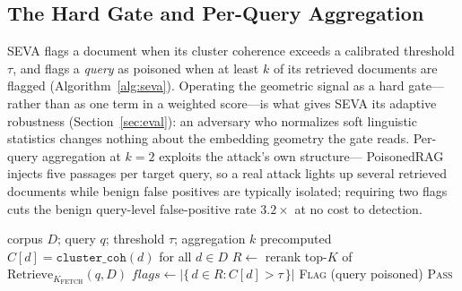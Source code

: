 \documentclass[10pt,journal,compsoc]{IEEEtran}
\begin{document}
\subsection{The Hard Gate and Per-Query Aggregation}
SEVA flags a document when its cluster coherence exceeds a calibrated threshold
$\tau$, and flags a \emph{query} as poisoned when at least $k$ of its retrieved
documents are flagged (Algorithm~\ref{alg:seva}). Operating the geometric signal
as a hard gate---rather than as one term in a weighted score---is what gives SEVA
its adaptive robustness (Section~\ref{sec:eval}): an adversary who normalizes soft
linguistic statistics changes nothing about the embedding geometry the gate
reads. Per-query aggregation at $k=2$ exploits the attack's own structure---%
PoisonedRAG injects five passages per target query, so a real attack
lights up several retrieved documents while benign false positives are typically
isolated; requiring two flags cuts the benign query-level false-positive rate
$3.2\times$ at no cost to detection.

\begin{algorithm}[t]
\caption{SEVA detection (\texttt{cluster\_coh} hard gate)}
\label{alg:seva}
\begin{algorithmic}[1]
\REQUIRE corpus $D$; query $q$; threshold $\tau$; aggregation $k$
\REQUIRE precomputed $C[d]=\texttt{cluster\_coh}(d)$ for all $d\in D$
\STATE $R \leftarrow$ rerank top-$K$ of $\mathrm{Retrieve}_{K_{\mathrm{FETCH}}}(q, D)$
\STATE $\mathit{flags} \leftarrow \big|\{\, d \in R : C[d] > \tau \,\}\big|$
\RETURN \textsc{Flag} \quad (query poisoned)
\ELSE
\RETURN \textsc{Pass}
\ENDIF
\end{algorithmic}
\end{algorithm}
\end{document}
